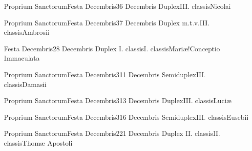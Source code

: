 \documentclass[psalterium-feriale.tex]{subfiles}
\begin{document}
	{Proprium Sanctorum}{Festa Decembris}{3}{6 Decembris}
	{Duplex}{III. classis}{Nicolai}
	{}
	{}
\COPObRubric

	{Proprium Sanctorum}{Festa Decembris}{3}{7 Decembris}
	{Duplex m.t.v.}{III. classis}{Ambrosii}
	{}
	{}
\COPOcRubric

	{Festa Decembris}{2}{8 Decembris}
	{Duplex I. classis}{I. classis}{Mariæ!Conceptio Immaculata}
	{}
	{}
\psalmodiapropria


	{Proprium Sanctorum}{Festa Decembris}{3}{11 Decembris}
	{Semiduplex}{III. classis}{Damasii}
	{}
	{}
\COPOaRubric

	{Proprium Sanctorum}{Festa Decembris}{3}{13 Decembris}
	{Duplex}{III. classis}{Luciæ}
	{}
	{}
\MUVMbRubric

	{Proprium Sanctorum}{Festa Decembris}{3}{16 Decembris}
	{Semiduplex}{III. classis}{Eusebii}
	{}
	{}
\UMEXaRubric

	{Proprium Sanctorum}{Festa Decembris}{2}{21 Decembris}
	{Duplex II. classis}{II. classis}{Thomæ Apostoli}
	{}
	{}
\psalmodiapropria
\end{document}
